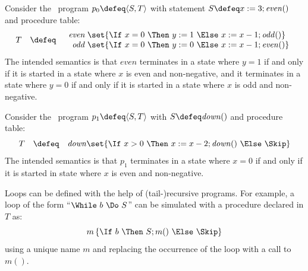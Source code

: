 \documentclass[a4paper,numberwithinsect]{lipics-v2021}
\begin{document}
\begin{example}
\label{ex:rec-program}
  Consider the \Rec\ program $p_0\defeq\langle S, T\rangle$ with statement
  $S\defeq x := 3; \mathit{even} ()$ and procedure table:
  $$ T\quad\defeq\quad
  \begin{array}{r@{\;}l}
    \mathit{even} & \set{\If\ x = 0\ \Then\ y := 1\ \Else\ x := x-1; \mathit{odd} ()} \\
    \mathit{odd} & \set{\If\ x = 0\ \Then\ y := 0\ \Else\ x := x-1; \mathit{even} ()}
  \end{array}
  $$
  The intended semantics is that $\mathit{even}$ terminates in a state
  where $y=1$ if and only if it is started in a state where $x$ is
  even and non-negative, and it terminates in a state where $y=0$ if
  and only if it is started in a state where $x$ is odd and
  non-negative.
\end{example}

\begin{example}
\label{ex:rec-program-simple}
  Consider the \Rec\ program $p_1\defeq\langle S, T\rangle$ with
  $S\defeq\mathit{down}()$ and procedure table:
  $$ T\quad\defeq\quad
  \mathit{down} 
  \set{\If\ x > 0\ \Then\ x := x-2; \mathit{down}()\ \Else\ \Skip}
  $$
  The intended semantics is that $p_1$ terminates in a state where
  $x=0$ if and only if it is started in state where $x$ is even and
  non-negative.
\end{example}

\begin{remark}\label{rem:while-syn}
  Loops can be defined with the help of (tail-)recursive programs.
  For example, a loop of the form ``$\While\ b\ \Do\ S$'' can be
  simulated with a procedure declared in $T$ as:
  $$
  m\,\{\If\ b\ \Then\ S;m()\ \Else\ \Skip\}
  $$
  using a unique name $m$ and replacing the occurrence of the loop
  with a call to $m()$.
\end{remark}
\end{document}
